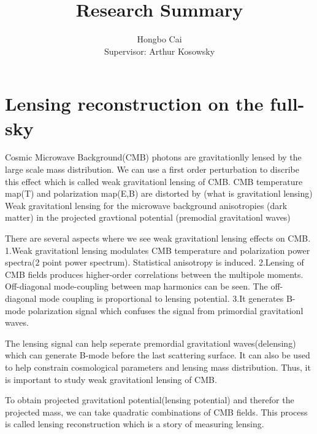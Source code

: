 \documentclass[12pt, notitlepage, onecolumn, amsmath, amssymb, aps]{revtex4-1}
\title{}
\begin{document}
\title{Research Summary}
\author{Hongbo Cai \\{\small Supervisor: Arthur Kosowsky}}
\maketitle
\newcommand{\edit}[1]{\textcolor{red}{(#1)}}
\vspace{-1.5cm}
\section{Lensing reconstruction on the full-sky}
\label{sec:org8852578}


Cosmic Microwave Background(CMB) photons are gravitationlly lensed by the large scale mass distribution. We can use a first order perturbation to discribe this effect which is called weak gravitationl lensing of CMB.
CMB temperature map(T) and polarization map(E,B) are distorted by 
(what is gravitationl lensing)
Weak gravitationl lensing for the microwave background anisotropies
(dark matter)
in the projected gravtional potential
(premodial gravitationl waves)




There are several aspects where we see weak gravitationl lensing effects on CMB.
1.Weak gravitationl lensing modulates CMB temperature and polarization power spectra(2 point power spectrum). Statistical anisotropy is induced.
2.Lensing of CMB fields produces higher-order correlations between the multipole moments. Off-diagonal mode-coupling between map harmonics can be seen. The off-diagonal mode coupling is proportional to lensing potential.\cite{Hu:2001kj}
3.It generates B-mode polarization signal which confuses the signal from primordial gravitationl waves.

The lensing signal can help seperate premordial gravitationl waves(delensing) which can generate B-mode before the last scattering surface. It can also be used to help constrain cosmological parameters and lensing mass distribution. Thus, it is important to study weak gravitationl lensing of CMB.

To obtain projected gravitationl potential(lensing potential) and therefor the projected mass, we can take quadratic combinations of CMB fields. This process is called lensing reconstruction which is a story of measuring lensing. 
\end{document}
